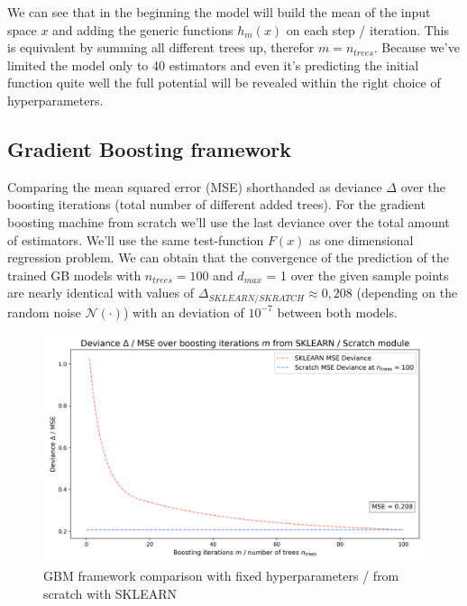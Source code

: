 \documentclass[12pt, a4paper]{article}
\begin{document}
We can see that in the beginning the model will build the mean of the input space $x$ and adding the generic functions $h_m(x)$ on each step / iteration. This is equivalent by summing all different trees up, therefor $m = n_{trees}$. Because we've limited the model only to 40 estimators and even it's predicting the initial function quite well the full potential will be revealed within the right choice of hyperparameters.
\subsection{Gradient Boosting framework}
Comparing the mean squared error (MSE) shorthanded as deviance $\Delta$ over the boosting iterations (total number of different added trees). For the gradient boosting machine from scratch we'll use the last deviance over the total amount of estimators. We'll use the same test-function $F(x)$ as one dimensional regression problem.
We can obtain that the convergence of the prediction of the trained GB models with $n_{trees} = 100$ and $d_{max}$ = 1 over the given sample points are nearly identical with values of $\Delta_{SKLEARN/SKRATCH} \approx 0,208$  (depending on the random noise $\mathcal{N}(\cdot)$) with an deviation of $10^{-7}$ between both models.
\begin{figure}[!htpb]
    \centering
    \includegraphics[width=1\textwidth,trim={0 0 0 0},clip]{figures/gbm_scratch_sklearn_loss_comparison.png}
    \caption[GBM framework comparison]{GBM framework comparison with fixed hyperparameters / from scratch with SKLEARN}
    \label{fig: gbm_comparison}    
\end{figure}
\end{document}
